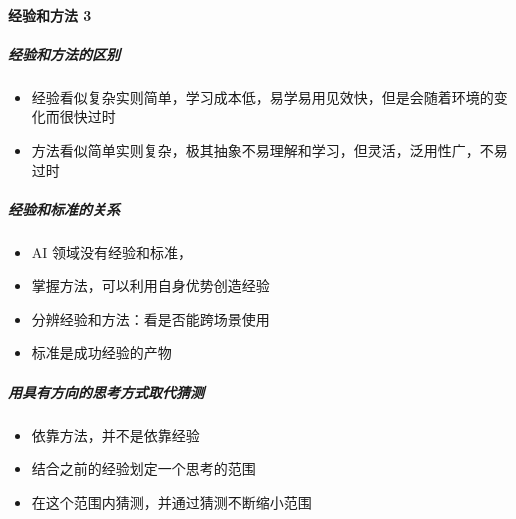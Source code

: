 \documentclass[letterpaper,11pt,english]{sphinxmanual}
\begin{document}
\paragraph{经验和方法 3\sphinxfootnotemark[353]}
\label{\detokenize{chapter_idea/critical:id2}}%
\begin{footnotetext}[353]\sphinxAtStartFootnote
{}
%
\end{footnotetext}\ignorespaces 

\subparagraph{经验和方法的区别}
\label{\detokenize{chapter_idea/critical:id3}}\begin{itemize}
\item {} 
经验看似复杂实则简单，学习成本低，易学易用见效快，但是会随着环境的变化而很快过时

\item {} 
方法看似简单实则复杂，极其抽象不易理解和学习，但灵活，泛用性广，不易过时

\end{itemize}


\subparagraph{经验和标准的关系}
\label{\detokenize{chapter_idea/critical:id4}}\begin{itemize}
\item {} 
AI 领域没有经验和标准，

\item {} 
掌握方法，可以利用自身优势创造经验

\item {} 
分辨经验和方法：看是否能跨场景使用

\item {} 
标准是成功经验的产物

\end{itemize}


\subparagraph{用具有方向的思考方式取代猜测}
\label{\detokenize{chapter_idea/critical:id5}}\begin{itemize}
\item {} 
依靠方法，并不是依靠经验

\item {} 
结合之前的经验划定一个思考的范围

\item {} 
在这个范围内猜测，并通过猜测不断缩小范围

\end{itemize}
\end{document}
